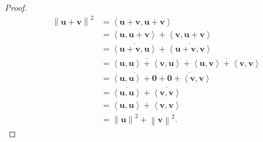 \begin{proof}
	\begin{align*}
		\left\lVert \mathbf{u}+\mathbf{v} \right\rVert ^2&=\left<\mathbf{u}+\mathbf{v},\mathbf{u}+\mathbf{v} \right>\\
								 &=\left<\mathbf{u},\mathbf{u}+\mathbf{v} \right>+\left<\mathbf{v},\mathbf{u}+\mathbf{v} \right>\\
								 &=\overline{\left<\mathbf{u}+\mathbf{v},\mathbf{u} \right>} +\overline{\left<\mathbf{u}+\mathbf{v},\mathbf{v} \right>} \\
								 &=\overline{\left<\mathbf{u},\mathbf{u} \right>+\left<\mathbf{v},\mathbf{u} \right>} +\overline{\left<\mathbf{u},\mathbf{v} \right>+\left<\mathbf{v},\mathbf{v} \right>} \\
								 &=\overline{\left<\mathbf{u},\mathbf{u} \right>+\mathbf{0}} +\overline{\mathbf{0}+\left<\mathbf{v},\mathbf{v} \right>} \\
								 &=\overline{\left<\mathbf{u},\mathbf{u} \right>} +\overline{\left<\mathbf{v},\mathbf{v} \right>} \\
								 &=\left<\mathbf{u},\mathbf{u} \right>+\left<\mathbf{v},\mathbf{v} \right>\\
								 &=\left\lVert \mathbf{u} \right\rVert ^2+\left\lVert \mathbf{v} \right\rVert ^2
	.\end{align*}
\end{proof}
